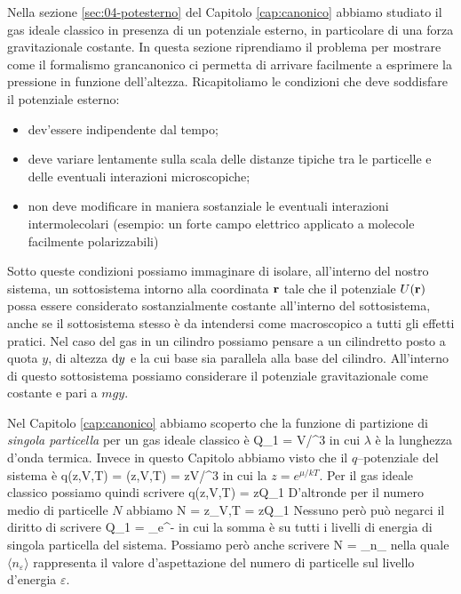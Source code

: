 Nella sezione \ref{sec:04-potesterno} del Capitolo \ref{cap:canonico} abbiamo studiato il gas ideale classico in presenza di un potenziale esterno, in particolare di una forza gravitazionale costante. In questa sezione riprendiamo il problema per mostrare come il formalismo grancanonico ci permetta di arrivare facilmente a esprimere la pressione in funzione dell'altezza. Ricapitoliamo le condizioni che deve soddisfare il potenziale esterno:
\begin{itemize}
\item dev'essere indipendente dal tempo;
\item deve variare lentamente sulla scala delle distanze tipiche tra le particelle e delle eventuali interazioni microscopiche;
\item non deve modificare in maniera sostanziale le eventuali interazioni intermolecolari (esempio: un forte campo elettrico applicato a molecole facilmente polarizzabili)
\end{itemize}
Sotto queste condizioni possiamo immaginare di isolare, all'interno del nostro sistema, un sottosistema intorno alla coordinata $\mathbf{r}$ tale che il potenziale $U(\mathbf{r})$ possa essere considerato sostanzialmente costante all'interno del sottosistema, anche se il sottosistema stesso è da intendersi come macroscopico a tutti gli effetti pratici. Nel caso del gas in un cilindro possiamo pensare a un cilindretto posto a quota $y$, di altezza ${\textrm d}y$ e la cui base sia parallela alla base del cilindro. All'interno di questo sottosistema possiamo considerare il potenziale gravitazionale come costante e pari a $mgy$.

Nel Capitolo \ref{cap:canonico} abbiamo scoperto che la funzione di partizione di {\em singola particella} per un gas ideale classico è
\be
Q_1 = V/\lambda^3
\ee
in cui $\lambda$ è la lunghezza d'onda termica. Invece in questo Capitolo abbiamo visto che il $q$--potenziale del sistema è
\be
q(z,V,T) = \ln\calQ(z,V,T) = zV/\lambda^3
\ee
in cui la $z = e^{\mu/kT}$. Per il gas ideale classico possiamo quindi scrivere
\be
q(z,V,T) = zQ_1
\ee
D'altronde per il numero medio di particelle $N$ abbiamo
\be
\label{eq:05-conGC0}
N = z_{V,T} = zQ_1
\ee
Nessuno però può negarci il diritto di scrivere
\be
\label{eq:05-conGC1}
Q_1 = \sum_\varepsilon e^{-\beta\varepsilon}
\ee
in cui la somma è su tutti i livelli di energia di singola particella del sistema. Possiamo però anche scrivere
\be
\label{eq:05-conGC2}
N = \sum_\varepsilon \langle n_\varepsilon\rangle
\ee
nella quale $\langle n_\varepsilon\rangle$ rappresenta il valore d'aspettazione del numero di particelle sul livello d'energia $\varepsilon$.

